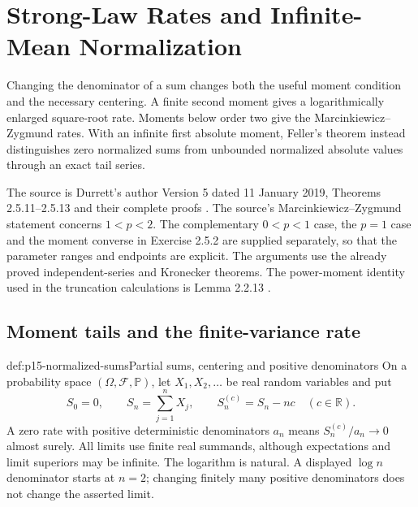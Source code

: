 \chapter{Strong-Law Rates and Infinite-Mean Normalization}
\label{sec:p15-strong-law-rates-and-normalization}

Changing the denominator of a sum changes both the useful moment
condition and the necessary centering. A finite second moment gives a
logarithmically enlarged square-root rate. Moments below order two give
the Marcinkiewicz--Zygmund rates. With an infinite first absolute moment,
Feller's theorem instead distinguishes zero normalized sums from
unbounded normalized absolute values through an exact tail series.

The source is Durrett's author Version 5 dated 11 January 2019,
Theorems 2.5.11--2.5.13 and their complete proofs
\cite[pp.~87--90]{DurrettPTEAuthor2019}. The source's
Marcinkiewicz--Zygmund statement concerns \(1<p<2\).
The complementary \(0<p<1\) case, the \(p=1\) case and the moment
converse in Exercise 2.5.2 are supplied separately, so that the
parameter ranges and endpoints are explicit. The arguments use the
already proved independent-series and Kronecker theorems.
The power-moment identity used in the truncation calculations is
Lemma 2.2.13 \cite[pp.~63--64]{DurrettPTEAuthor2019}.

\section{Moment tails and the finite-variance rate}
\label{sec:p15-rate-moment-tools}

\begin{hbdefinition}{def:p15-normalized-sums}{Partial sums, centering and positive denominators}
On a probability space \((\Omega,\mathcal F,\mathbb P)\), let
\(X_1,X_2,\ldots\) be real random variables and put
\[
 S_0=0,\qquad S_n=\sum_{j=1}^nX_j,\qquad
 S_n^{(c)}=S_n-nc\quad(c\in\mathbb R).
\]
A zero rate with positive deterministic denominators \(a_n\) means
\(S_n^{(c)}/a_n\to0\) almost surely. All limits use finite real
summands, although expectations and limit superiors may be infinite.
The logarithm is natural. A displayed \(\log n\) denominator starts
at \(n=2\); changing finitely many positive denominators does not
change the asserted limit.
\end{hbdefinition}

